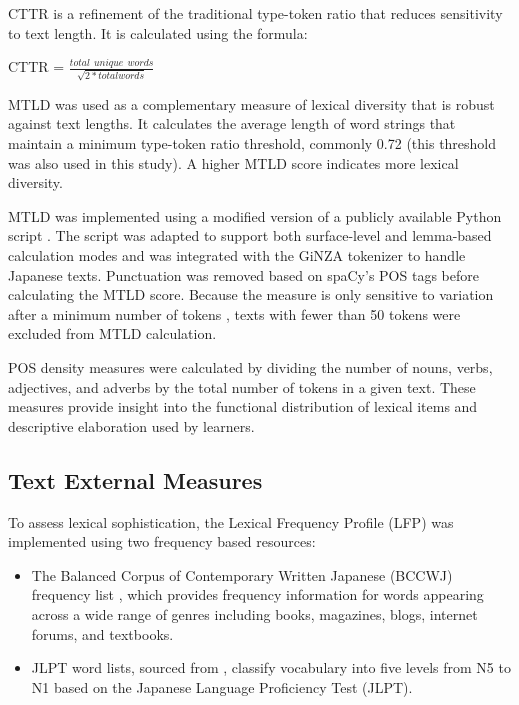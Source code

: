 CTTR is a refinement of the traditional type-token ratio that reduces sensitivity to text length. It is calculated
using the formula:
\begin{center}
    \centering CTTR = ${\displaystyle \frac{total \hspace{5pt} unique\hspace{5pt} words}{\sqrt{2*total words}} } $
\end{center}
\vspace{5pt}

MTLD was used as a complementary measure of lexical diversity that is robust against text lengths. It calculates the
average length of word strings that maintain a minimum type-token ratio threshold, commonly 0.72 (this threshold was
also used in this study). A higher
MTLD
score indicates more lexical diversity.

MTLD was implemented using a modified version of a
publicly
available
Python script \citep{MTLD_repo}. The script was adapted to support both surface-level and lemma-based calculation
modes and was integrated with the GiNZA tokenizer to handle Japanese texts. Punctuation was removed based on
spaCy's POS tags before
calculating the MTLD score. Because the measure is only sensitive to variation after a minimum number of tokens \citep{McCarthy2010},
texts with fewer than 50 tokens were excluded from MTLD calculation.

POS density measures were calculated by dividing the number of nouns, verbs, adjectives, and
adverbs by the total
number of tokens in a given text. These measures provide insight into the functional distribution of lexical items and
descriptive elaboration used by learners.


\subsection{Text External Measures}
To assess lexical sophistication, the Lexical Frequency Profile (LFP) was implemented using two frequency based
resources:
\begin{itemize}
    \item The Balanced Corpus of Contemporary Written Japanese (BCCWJ) frequency list \citep{maekawa2014}, which
    provides frequency information for words appearing across a wide range of genres including books, magazines,
    blogs,
    internet
    forums, and textbooks.
    \item JLPT word lists, sourced from \citep{jisho.org}, classify vocabulary into five levels from N5 to N1 based on the Japanese Language Proficiency Test (JLPT).
    \end{itemize}

